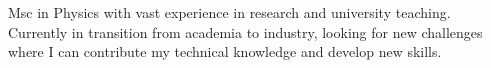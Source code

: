 
Msc in Physics with vast experience in research and university teaching. Currently in transition from academia to industry, looking for new challenges where I can contribute my technical knowledge and develop new skills.
